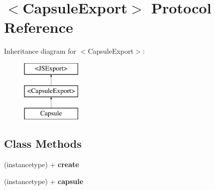 \hypertarget{protocol_capsule_export-p}{}\section{$<$Capsule\+Export$>$ Protocol Reference}
\label{protocol_capsule_export-p}
Inheritance diagram for $<$Capsule\+Export$>$\+:\begin{figure}[H]
\begin{center}
\leavevmode
\includegraphics[height=3.000000cm]{protocol_capsule_export-p}
\end{center}
\end{figure}
\subsection*{Class Methods}
\begin{DoxyCompactItemize}
\item 
\hypertarget{protocol_capsule_export-p_ace0a2546626cc4bebbdf8fa5162f9cda}{}(instancetype) + {\bfseries create}\label{protocol_capsule_export-p_ace0a2546626cc4bebbdf8fa5162f9cda}

\item 
\hypertarget{protocol_capsule_export-p_ac636a689923dcea422ff1961e979d3da}{}(instancetype) + {\bfseries capsule}\label{protocol_capsule_export-p_ac636a689923dcea422ff1961e979d3da}

\end{DoxyCompactItemize}
